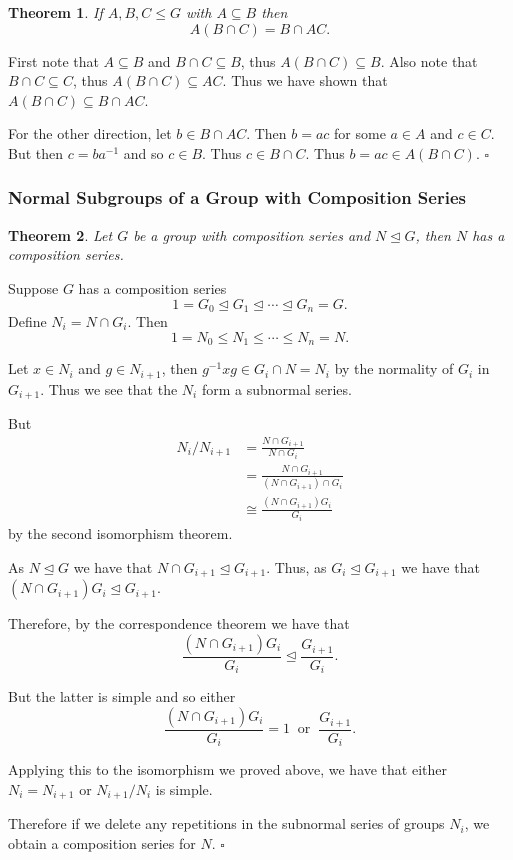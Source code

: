 \documentclass[10pt]{article}
\newtheorem{theorem}{Theorem}[section]
\newenvironment{proof}[1][Proof]{\begin{trivlist}
\item[\hskip \labelsep {\itshape #1}]}{\end{trivlist}}
\begin{document}
\begin{theorem}
If $A, B, C \leq G$ with $A \subseteq B$ then
$$A(B\cap C) = B\cap AC.$$
\end{theorem}

\begin{proof}
First note that $A \subseteq B$ and $B\cap C \subseteq B$, thus $A(B\cap C) \subseteq B$. Also note that $B\cap C \subseteq C$, thus $A(B\cap C) \subseteq AC$. Thus we have shown that $A(B\cap C) \subseteq B\cap AC$.

For the other direction, let $b \in B\cap AC$. Then $b = ac$ for some $a \in A$ and $c \in C$. But then $c = ba^{-1}$ and so $c \in B$. Thus $c \in B\cap C$. Thus $b = ac \in A(B\cap C)$. $\square$
\end{proof}

\subsubsection{Normal Subgroups of a Group with Composition Series}

\begin{theorem}
Let $G$ be a group with composition series and $N \mathrel{\unlhd} G$, then $N$ has a composition series.
\end{theorem}

\begin{proof}
Suppose $G$ has a composition series
$$1 = G_0 \mathrel{\unlhd} G_1 \mathrel{\unlhd} \cdots \mathrel{\unlhd} G_n = G.$$
Define $N_i = N\cap G_i$. Then
$$1 = N_0 \leq N_1 \leq \cdots \leq N_n = N.$$

Let $x \in N_i$ and $g \in N_{i+1}$, then $g^{-1}xg \in G_i\cap N = N_i$ by the normality of $G_i$ in $G_{i+1}$. Thus we see that the $N_i$ form a subnormal series.

But
\begin{align*}
N_i/N_{i+1} &= \frac{N\cap G_{i+1}}{N\cap G_i}\\
&= \frac{N\cap G_{i+1}}{(N\cap G_{i+1})\cap G_i}\\
&\cong \frac{(N\cap G_{i+1})G_i}{G_i}
\end{align*}
by the second isomorphism theorem.

As $N \mathrel{\unlhd} G$ we have that $N\cap G_{i+1} \mathrel{\unlhd} G_{i+1}$. Thus, as $G_i \mathrel{\unlhd} G_{i+1}$ we have that $(N\cap G_{i+1})G_i \mathrel{\unlhd} G_{i+1}$.

Therefore, by the correspondence theorem we have that
$$\frac{(N\cap G_{i+1})G_i}{G_i} \mathrel{\unlhd} \frac{G_{i+1}}{G_i}.$$

But the latter is simple and so either
$$\frac{(N\cap G_{i+1})G_i}{G_i} = 1 \;\;\mbox{or}\;\; \frac{G_{i+1}}{G_i}.$$

Applying this to the isomorphism we proved above, we have that either $N_i = N_{i+1}$ or $N_{i+1}/N_i$ is simple.

Therefore if we delete any repetitions in the subnormal series of groups $N_i$, we obtain a composition series for $N$. $\square$
\end{proof}
\end{document}
